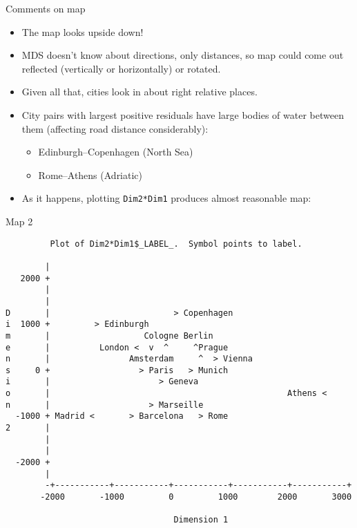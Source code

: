 \documentclass[pdf]{prosper}
\begin{document}
\begin{slide}{Comments on map}

  \begin{itemize}
  \item The map looks upside down!
  \item MDS doesn't know about directions, only distances, so map could come out reflected (vertically or horizontally) or rotated.
  \item Given all that, cities look in about right relative places.
  \item City pairs with largest positive residuals have large bodies of water between them (affecting road distance considerably):
    \begin{itemize}
    \item Edinburgh--Copenhagen (North Sea)
    \item Rome--Athens (Adriatic) 
    \end{itemize}
  \item As it happens, plotting \verb-Dim2*Dim1- produces almost reasonable map:
  \end{itemize}
  
\end{slide}

\begin{slide}{Map 2}
  {\scriptsize
\begin{verbatim}
         Plot of Dim2*Dim1$_LABEL_.  Symbol points to label.

        |
   2000 +
        |
        |
D       |                         > Copenhagen
i  1000 +         > Edinburgh
m       |                   Cologne Berlin
e       |          London <  v  ^     ^Prague
n       |                Amsterdam     ^  > Vienna
s     0 +                  > Paris   > Munich
i       |                      > Geneva
o       |                                                Athens <
n       |                    > Marseille
  -1000 + Madrid <       > Barcelona   > Rome
2       |
        |
        |
  -2000 +
        |
        -+-----------+-----------+-----------+-----------+-----------+
       -2000       -1000         0         1000        2000       3000

                                  Dimension 1

\end{verbatim}
}
\end{slide}
\end{document}
